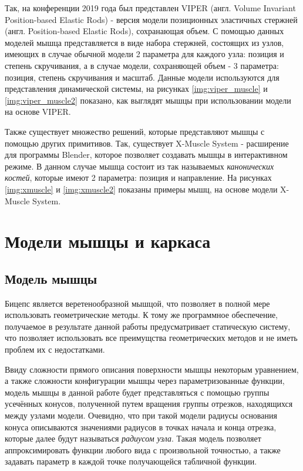 Так, на конференции 2019 года был представлен VIPER\cite{viper} (англ. Volume Invariant Position-based Elastic Rods) - версия модели позиционных эластичных стержней\cite{per} (англ. Position-based Elastic Rods), сохранающая объем. С помощью данных моделей мышца представляется в виде набора стержней, состоящих из узлов, имеющих в случае обычной модели 2 параметра для каждого узла: позиция и степень скручивания, а в случае модели, сохраняющей объем - 3 параметра: позиция, степень скручивания и масштаб. Данные модели используются для представления динамической системы, на рисунках \ref{img:viper_muscle} и \ref{img:viper_muscle2} показано, как выглядят мышцы при использовании модели на основе VIPER.




Также существует множество решений, которые представляют мышцы с помощью других примитивов. Так, существует X-Muscle System\cite{xms} - расширение для программы Blender\cite{blender}, которое позволяет создавать мышцы в интерактивном режиме. В данном случае мышца состоит из так называемых \textit{канонических костей}, которые имеют 2 параметра: позиция и направление. На рисунках \ref{img:xmuscle} и \ref{img:xmuscle2} показаны примеры мышц, на основе модели X-Muscle System.



\section{Модели мышцы и каркаса}

\subsection{Модель мышцы}

Бицепс является веретенообразной мышцой, что позволяет в полной мере использовать геометрические методы. К тому же программное обеспечение, получаемое в результате данной работы предусматривает статическую систему, что позволяет использовать все преимущства геометрических методов и не иметь проблем их с недостатками.

Ввиду сложности прямого описания поверхности мышцы некоторым уравнением, а также сложности конфигурации мышцы через параметризованные функции, модель мышцы в данной работе будет представляться с помощью группы усечённых конусов, полученной путем вращения группы отрезков, находящихся между узлами модели. Очевидно, что при такой модели радиусы основания конуса описываются значениями радиусов в точках начала и конца отрезка, которые далее будут называться \textit{радиусом узла}. Такая модель позволяет аппроксимировать функции любого вида с произвольной точностью, а также задавать параметр в каждой точке получающейся табличной функции.

